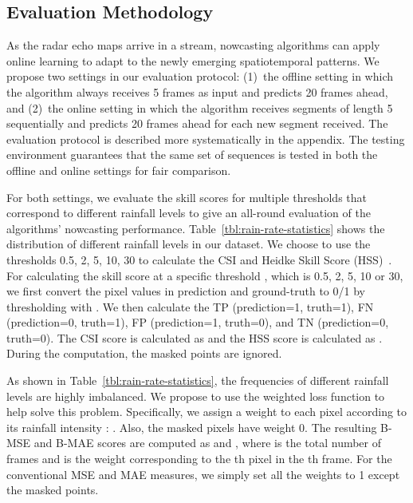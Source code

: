 \documentclass{article}
\begin{document}
\subsection{Evaluation Methodology}
As the radar echo maps arrive in a stream, nowcasting algorithms can apply online learning to adapt to the newly emerging spatiotemporal patterns. We propose two settings in our evaluation protocol: (1)~the offline setting in which the algorithm always receives 5 frames as input and predicts 20 frames ahead, and (2)~the online setting in which the algorithm receives segments of length 5 sequentially and predicts 20 frames ahead for each new segment received. The evaluation protocol is described more systematically in the appendix. The testing environment guarantees that the same set of sequences is tested in both the offline and online settings for fair comparison.

For both settings, we evaluate the skill scores for multiple thresholds that correspond to different rainfall levels to give an all-round evaluation of the algorithms' nowcasting performance. Table~\ref{tbl:rain-rate-statistics} shows the distribution of different rainfall levels in our dataset. We choose to use the thresholds 0.5, 2, 5, 10, 30 to calculate the CSI and Heidke Skill Score (HSS)~\cite{hogan2010equitability}. For calculating the skill score at a specific threshold , which is 0.5, 2, 5, 10 or 30, we first convert the pixel values in prediction and ground-truth to 0/1 by thresholding with . We then calculate the TP (prediction=1, truth=1), FN (prediction=0, truth=1), FP (prediction=1, truth=0), and TN (prediction=0, truth=0). The CSI score is calculated as  and the HSS score is calculated as . During the computation, the masked points are ignored.

As shown in Table~\ref{tbl:rain-rate-statistics}, the frequencies of different rainfall levels are highly imbalanced. We propose to use the weighted loss function to help solve this problem. Specifically, we assign a weight  to each pixel according to its rainfall intensity : .
Also, the masked pixels have weight 0. The resulting B-MSE and B-MAE scores are computed as  and , where  is the total number of frames and  is the weight corresponding to the th pixel in the th frame. For the conventional MSE and MAE measures, we simply set all the weights to 1 except the masked points.
\end{document}
